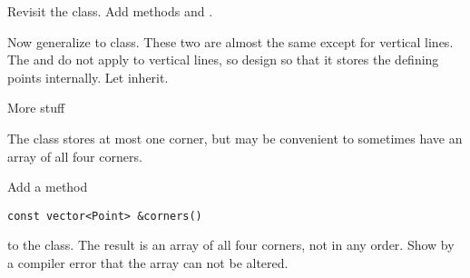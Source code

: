 \begin{exercise}
  \label{ex:geom:line3}
  Revisit the  class.
  Add methods  and .

  Now generalize  to 
  class. These two are almost the same except for vertical lines.
  The  and  do not apply to vertical lines, so
  design  so that it stores the defining points
  internally. Let  inherit.
\end{exercise}

 {More stuff}

\prerequisite{\ref{sec:class-ref}}

The  class stores at most one corner, but may be
convenient to sometimes have an array of all four corners.

\begin{exercise}
  \label{ex:geom:corners}
  Add a method
\begin{lstlisting}
const vector<Point> &corners()
\end{lstlisting}
to the  class. The result is an array of all four
corners, not in any order. Show by a compiler error that the array can
not be altered.
\end{exercise}
